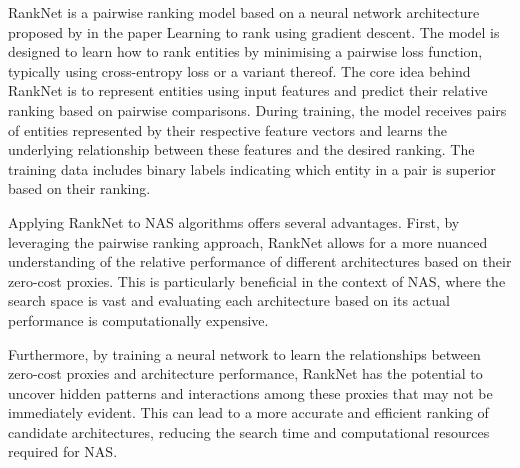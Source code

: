 RankNet is a pairwise ranking model based on a neural network architecture proposed by \cite{burges2005learning} in the paper Learning to rank using gradient descent. The model is designed to learn how to rank entities by minimising a pairwise loss function, typically using cross-entropy loss or a variant thereof. The core idea behind RankNet is to represent entities using input features and predict their relative ranking based on pairwise comparisons. During training, the model receives pairs of entities represented by their respective feature vectors and learns the underlying relationship between these features and the desired ranking. The training data includes binary labels indicating which entity in a pair is superior based on their ranking.

Applying RankNet to NAS algorithms offers several advantages. First, by leveraging the pairwise ranking approach, RankNet allows for a more nuanced understanding of the relative performance of different architectures based on their zero-cost proxies. This is particularly beneficial in the context of NAS, where the search space is vast and evaluating each architecture based on its actual performance is computationally expensive.

Furthermore, by training a neural network to learn the relationships between zero-cost proxies and architecture performance, RankNet has the potential to uncover hidden patterns and interactions among these proxies that may not be immediately evident. This can lead to a more accurate and efficient ranking of candidate architectures, reducing the search time and computational resources required for NAS.

\begin{comment}
The model consists of a neural network with one or more hidden layers, which processes the input features and outputs a single scalar score for each entity. The difference in scores between entities in a pair represents their predicted ranking. The model's parameters are learned through gradient descent by minimising the pairwise loss function, quantifying the difference between the predicted and true preferences in the training data.

Using RankNet, researchers can develop ranking-based approaches for various applications, including evaluating and selecting architectures in Neural Architecture Search (NAS) algorithms. Adapting RankNet to use zero-cost proxies as input features enables leveraging the information provided by these proxies to guide the search process towards the most promising candidate architectures.

\end{comment}


